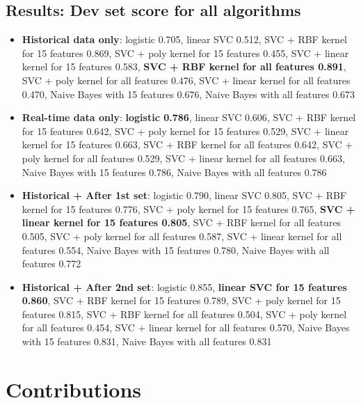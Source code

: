\documentclass[paper=a4, fontsize=10pt]{scrartcl} %
\numberwithin{equation}{section} %
\numberwithin{figure}{section} %
\numberwithin{table}{section} %
\begin{document}
\subsection{Results: Dev set score for all algorithms}
\label{sec:app}
\begin{itemize}
\item \textbf{Historical data only}: logistic 0.705, linear SVC 0.512, SVC + RBF kernel for 15 features 0.869, SVC + poly kernel for 15 features 0.455, SVC + linear kernel for 15 features 0.583, \textbf{SVC + RBF kernel for all features 0.891}, SVC + poly kernel for all features 0.476, SVC + linear kernel for all features 0.470, Naive Bayes with 15 features 0.676, Naive Bayes with all features 0.673
\item \textbf{Real-time data only}: \textbf{logistic 0.786}, linear SVC 0.606, SVC + RBF kernel for 15 features 0.642, SVC + poly kernel for 15 features 0.529, SVC + linear kernel for 15 features 0.663, SVC + RBF kernel for all features 0.642, SVC + poly kernel for all features 0.529, SVC + linear kernel for all features 0.663, Naive Bayes with 15 features 0.786, Naive Bayes with all features 0.786
\item \textbf{Historical + After 1st set}:  logistic 0.790,  linear SVC 0.805, SVC + RBF kernel for 15 features 0.776, SVC + poly kernel for 15 features 0.765, \textbf{SVC + linear kernel for 15 features 0.805}, SVC + RBF kernel for all features 0.505, SVC + poly kernel for all features 0.587, SVC + linear kernel for all features 0.554, Naive Bayes with 15 features 0.780, Naive Bayes with all features 0.772
\item \textbf{Historical + After 2nd set}: logistic 0.855, \textbf{linear SVC for 15 features 0.860},  SVC + RBF kernel for 15 features 0.789, SVC + poly kernel for 15 features 0.815, SVC + RBF kernel for all features 0.504, SVC + poly kernel for all features 0.454, SVC + linear kernel for all features 0.570, Naive Bayes with 15 features 0.831, Naive Bayes with all features 0.831
\end{itemize}
\section{Contributions}
\end{document}
